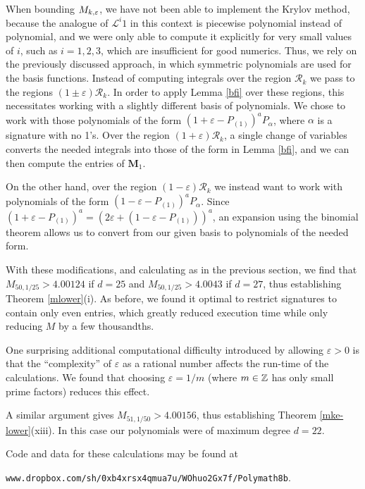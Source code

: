 When bounding $M_{k,\varepsilon}$, we have not been able to implement the Krylov method, because the analogue of ${\mathcal L}^i 1$ in this context is piecewise polynomial instead of polynomial, and we were only able to compute it explicitly for very small values of $i$, such as $i=1,2,3$, which are insufficient for good numerics.  Thus, we rely on the previously discussed approach, in which symmetric polynomials are used for the basis functions.  Instead of computing integrals over the region ${\mathcal R}_k$ we pass to the regions $(1\pm \varepsilon)\mathcal{R}_k$.  In order to apply Lemma \ref{bfi} over these regions, this necessitates working with a slightly different basis of polynomials.  We chose to work with those polynomials of the form $(1+\varepsilon-P_{(1)})^a P_{\alpha}$, where $\alpha$ is a signature with no 1's.  Over the region $(1+\varepsilon)\mathcal{R}_k$, a single change of variables converts the needed integrals into those of the form in Lemma \ref{bfi}, and we can then compute the entries of $\mathbf{M}_1$.

On the other hand, over the region $(1-\varepsilon)\mathcal{R}_k$ we instead want to work with polynomials of the form $(1-\varepsilon-P_{(1)})^aP_{\alpha}$.  Since $(1+\varepsilon-P_{(1)})^a=(2\varepsilon +(1-\varepsilon-P_{(1)}))^a$, an expansion using the binomial theorem allows us to convert from our given basis to polynomials of the needed form.

With these modifications, and calculating as in the previous section, we find that $M_{50,1/25}>4.00124$ if $d=25$ and $M_{50,1/25}>4.0043$ if $d=27$, thus establishing Theorem \ref{mlower}(i).  As before, we found it optimal to restrict signatures to contain only even entries, which greatly reduced execution time while only reducing $M$ by a few thousandths.

One surprising additional computational difficulty introduced by allowing $\varepsilon>0$ is that the ``complexity'' of $\varepsilon$ as a rational number affects the run-time of the calculations.  We found that choosing $\varepsilon=1/m$ (where $m\in \mathbb{Z}$ has only small prime factors) reduces this effect.

A similar argument gives $M_{51,1/50} > 4.00156$, thus establishing Theorem \ref{mke-lower}(xiii). In this case our polynomials were of maximum degree $d= 22$.

Code and data for these calculations may be found at 

\centerline{{\tt www.dropbox.com/sh/0xb4xrsx4qmua7u/WOhuo2Gx7f/Polymath8b}.}

